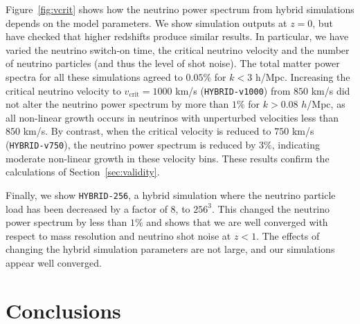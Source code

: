 \documentclass[useAMS, usenatbib]{mnras}
\begin{document}
Figure~\ref{fig:vcrit} shows how the neutrino power spectrum from hybrid simulations depends on the model parameters. We show simulation outputs at $z=0$, but have checked that higher redshifts produce similar results. In particular, we have varied the neutrino switch-on time, the critical neutrino velocity and the number of neutrino particles (and thus the level of shot noise). The total matter power spectra for all these simulations agreed to $0.05\%$ for $k < 3$ h/Mpc. Increasing the critical neutrino velocity to $v_\mathrm{crit} = 1000$ km/s (\texttt{HYBRID-v1000}) from $850$ km/s did not alter the neutrino power spectrum by more than $1\%$ for $k > 0.08$ $h$/Mpc, as all non-linear growth occurs in neutrinos with unperturbed velocities less than $850$ km/s. By contrast, when the critical velocity is reduced to $750$ km/s (\texttt{HYBRID-v750}), the neutrino power spectrum is reduced by $3\%$, indicating moderate non-linear growth in these velocity bins. These results confirm the calculations of Section~\ref{sec:validity}.

Finally, we show \texttt{HYBRID-256}, a hybrid simulation where the neutrino particle load has been decreased by a factor of $8$, to $256^3$. This changed the neutrino power spectrum by less than $1\%$ and shows that we are well converged with respect to mass resolution and neutrino shot noise at $z < 1$.
The effects of changing the hybrid simulation parameters are not large, and our simulations appear well converged.

\section{Conclusions}
\label{sec:conclusion}
\end{document}
